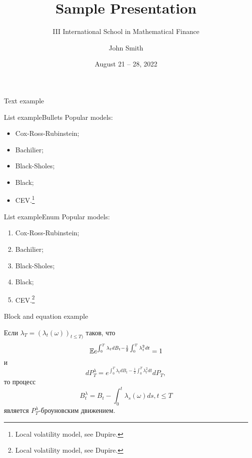 \documentclass[]{vegapresentation}
\title{Sample Presentation}
\subtitle{III International School in Mathematical Finance}
\author{John Smith}
\institute{Vega Institute Foundation}
\date{August 21 -- 28, 2022}
\begin{document}
    \maketitle

    \begin{frame}{Text example}
        \lipsum[1]
    \end{frame}

    \begin{frame}{List example}{Bullets}
        Popular models:
        \begin{itemize}
            \item Cox-Ross-Rubinstein;
            \item Bachilier;
            \item Black-Sholes;
            \item Black;
            \item CEV.\footnote{Local volatility model, see Dupire.}
        \end{itemize}
    \end{frame}

    \begin{frame}{List example}{Enum}
        Popular models:
        \begin{enumerate}
            \item Cox-Ross-Rubinstein;
            \item Bachilier;
            \item Black-Sholes;
            \item Black;
            \item CEV.\footnote{Local volatility model, see Dupire.}
        \end{enumerate}
    \end{frame}

    \begin{frame}{Block  and equation example}
        \begin{theorem}[И. Гирсанов]
			Если $\lambda_T = (\lambda_t (\omega))_{t \leq T)}$ таков, что 
			\begin{equation*}
				\mathbb{E} e^{\int_0^T \lambda_t dB_t - \frac{1}{2}\int_0^T \lambda_t^2 dt} = 1
			\end{equation*}
			и
			\begin{equation*}
			 dP_T^\lambda = e^{\int_0^T \lambda_t dB_t - \frac{1}{2}\int_0^T \lambda_t^2 dt} dP_T,
			\end{equation*}
			то процесс 
			\begin{equation*}
				B^\lambda_t = B_t - \int_0^t \lambda_s(\omega) ds, t \leq T
			\end{equation*}
			 является $P_T^\lambda$-броуновским движением.
		\end{theorem}
    \end{frame}
\end{document}
